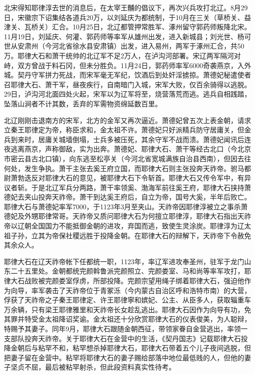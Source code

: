 北宋得知耶律淳去世的消息后，在太宰王黼的倡议下，再次兴兵攻打北辽。8月29日，宋徽宗下诏集结各道兵20万，以刘延庆为都统制，于10月在三关（草桥关、益津关、瓦桥关）汇合。10月25日，北辽都管押常胜军、涿州留守郭药师叛降北宋。11月19日，刘延庆、何灌、郭药师等率军从雄州出发，进入新城县；刘光世、杨可世从安肃州（今河北省徐水县安肃镇）出发，进入易州，两军于涿州汇合，共50万。耶律大石和萧干统帅的北辽军不足2万人，在泸沟河部署。宋辽两军隔河对峙，双方曾战于料石冈，但未分胜负。11月24日，郭药师率军6000奇袭燕京，入外城。契丹守军拼力死战，而宋军毫无军纪，饮酒后到处奸淫掳掠。萧德妃秘遣使者召耶律大石、萧干军，昼夜疾行，自南暗门入城，宋军大败，仅百余骑得以逃脱。29日，泸沟河北面四处火起，宋军以为辽军将至，烧营落荒而逃。逃兵自相践踏，坠落山涧者不计其数，丢弃的军需物资绵延数百里。

北辽刚刚击退南方的宋军，北方的金军又再次逼近。萧德妃曾五次上表金朝，请求立秦王耶律定为帝，称臣求和，金太祖不许。萧德妃只好派精兵防守居庸关，但金兵到来时，居庸关城墙倒塌，士兵多被压死，其余守军不战而溃。萧德妃闻讯后连夜逃离燕京，声称御敌，实为出奔。萧德妃、耶律大石、萧干等经古北口（今北京市密云县古北口镇），向东逃至松亭关（今河北省宽城满族自治县西南），但因去往何处，发生争执。萧干主张去奚王府立国，而耶律大石则主张投奔天祚帝。驸马都尉萧勃迭反对耶律大石的意见，被耶律大石下令斩首。耶律大石又传令军中，有异议者斩。于是北辽军兵分两路，萧干率领奚、渤海军前往奚王府，耶律大石挟持萧德妃去夹山投奔天祚帝。萧干到达奚王府后，自立为帝，国号大奚，半年后败亡。耶律大石与萧德妃率军7000，于1123年3月至夹山。天祚帝因耶律淳被立之事杀萧德妃及外甥耶律常哥。天祚帝又质问耶律大石为何擅立耶律淳，耶律大石指出天祚帝以辽朝全国国力不能抵御金朝的进攻，弃国而逃，致使生灵涂炭。耶律淳为辽太祖子孙，立其为帝保社稷远胜于投降金朝。在耶律大石的辩解下，天祚帝下令赦免其余众人。

耶律大石在辽天祚帝帐下任都统一职，1123年，率辽军进攻奉圣州，驻军于龙门山东二十五里处。金朝都统完颜斡鲁派完颜照立、完颜娄室、马和尚等率军攻打，耶律大石战败被完颜娄室俘虏，所部投降。完颜宗望用绳子绑着耶律大石，强迫他作为向导，率军袭击了天祚帝位于青冢泺（今内蒙古自治区呼和浩特市南）的大营，俘获了天祚帝之子秦王耶律定、许王耶律寧和嫔妃、公主、从臣多人，获取辎重车万余辆，只有梁王耶律雅里和天祚帝长女趁乱逃出。耶律大石因作为向导有功，免其罪并特受金太祖降诏奖谕。金太祖还十分欣赏耶律大石的仪表俊美，为人聪辩，特赐予其妻子。同年9月，耶律大石跟随金朝西征，带领家眷自金营逃出，率领一支部队投奔天祚帝。关于耶律大石在金营中的生活，《契丹国志》记载耶律大石投降金朝后与粘罕不和，粘罕想杀掉耶律大石，耶律大石带着五个儿子夜间逃脱，但把妻子留在金营中。粘罕将耶律大石的妻子赐给部落中地位最低贱的人，但他的妻子坚贞不屈，最后被粘罕射杀，但此段资料真实性待考。

